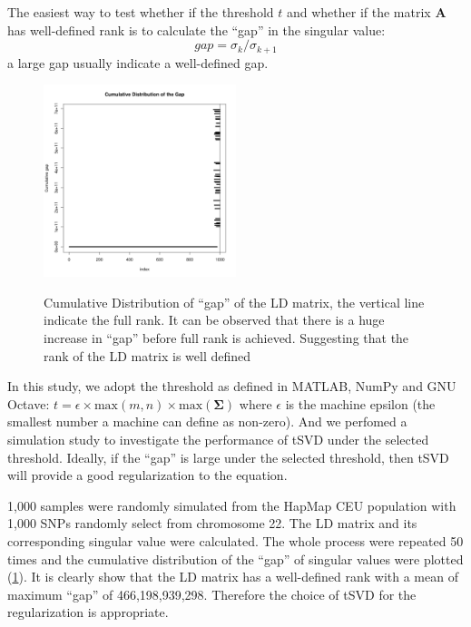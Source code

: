 			The easiest way to test whether if the threshold $t$ and whether if the matrix $\boldsymbol{A}$ has well-defined rank is to calculate the ``gap'' in the singular value:
			\begin{equation}
			gap = \sigma_k/\sigma_{k+1}
			\label{eq:gapSingular}
			\end{equation}
			a large gap usually indicate a well-defined gap. 
			\begin{figure}
				\caption[Cumulative Distribution of ``gap'' of the LD matrix]{Cumulative Distribution of ``gap'' of the LD matrix, the vertical line indicate the full rank. It can be observed that there is a huge increase in ``gap'' before full rank is achieved. Suggesting that the rank of the LD matrix is well defined}
				\centering
				\includegraphics[width=0.5\textwidth]{figure/singular_value_distribution.png}
				\label{fig:singularValueDist}
				\vspace{-20pt}
			\end{figure}
			In this study, we adopt the threshold as defined in MATLAB, NumPy and GNU Octave: $t=\epsilon\times\mathrm{max}(m,n)\times\mathrm{max}(\boldsymbol{\Sigma})$ where $\epsilon$ is the machine epsilon (the smallest number a machine can define as non-zero). 
			And we perfomed a simulation study to investigate the performance of \gls{tSVD} under the selected threshold.
			Ideally, if the ``gap'' is large under the selected threshold, then \gls{tSVD} will provide a good regularization to the equation. 
			
			1,000 samples were randomly simulated from the HapMap\citep{Altshuler2010} \acrshort{CEU} population with
			1,000 \glspl{SNP} randomly select from chromosome 22. 
			The \gls{LD} matrix and its corresponding singular value were calculated. 
			The whole process were repeated 50 times and the cumulative distribution of the ``gap'' of singular values were plotted (\cref{fig:singularValueDist}). 
			It is clearly show that the \gls{LD} matrix has a well-defined rank with a mean of maximum ``gap'' of 466,198,939,298.
			Therefore the choice of \gls{tSVD} for the regularization is appropriate.
			
